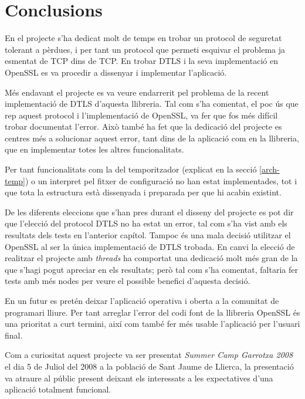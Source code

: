 \chapter{Conclusions}
En el projecte s'ha dedicat molt de temps en trobar un protocol de seguretat tolerant a pèrdues, i per tant un protocol que permeti esquivar el problema ja esmentat de TCP dins de TCP. En trobar DTLS i la seva implementació en OpenSSL es va procedir a dissenyar i implementar l'aplicació.

Més endavant el projecte es va veure endarrerit pel problema de la recent implementació de DTLS d'aquesta llibreria.
Tal com s'ha comentat, el poc ús que rep aquest protocol i l'implementació de OpenSSL, va fer que fos més difícil trobar documentat l'error. Això també ha fet que la dedicació del projecte es centres més a solucionar aquest error, tant dins de la aplicació com en la llibreria, que en implementar totes les altres funcionalitats.

Per tant funcionalitats com la del temporitzador (explicat en la secció \ref{arch-temp}) o un interpret pel fitxer de configuració no han estat implementades, tot i que tota la estructura està dissenyada i preparada per que hi acabin existint.

De les diferents eleccions que s'han pres durant el disseny del projecte es pot dir que l'elecció del protocol DTLS no ha estat un error, tal com s'ha vist amb els resultats dels tests en l'anterior capítol. Tampoc és una mala decisió utilitzar el OpenSSL al ser la única implementació de DTLS trobada. En canvi la elecció de realitzar el projecte amb \emph{threads} ha comportat una dedicació molt més gran de la que s'hagi pogut apreciar en els resultats; però tal com s'ha comentat, faltaria fer tests amb més nodes per veure el possible benefici d'aquesta decisió.

En un futur es pretén deixar l'aplicació operativa i oberta a la comunitat de programari lliure.
Per tant arreglar l'error del codi font de la llibreria OpenSSL és una prioritat a curt termini, així com també fer més usable l'aplicació per l'usuari final.

Com a curiositat aquest projecte va ser presentat \emph{Summer Camp Garrotxa 2008} el dia 5 de Juliol del 2008 a la població de Sant Jaume de Llierca, la presentació va atraure al públic present deixant els interessats a les expectatives d'una aplicació totalment funcional.
